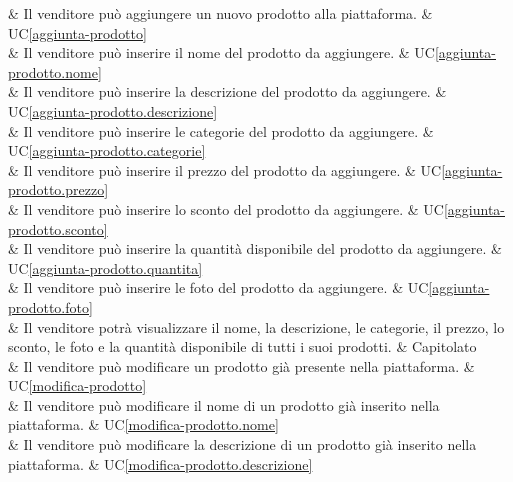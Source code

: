  & Il venditore può aggiungere un nuovo prodotto alla piattaforma. & UC\ref{aggiunta-prodotto} \\
	
 & Il venditore può inserire il nome del prodotto da aggiungere. & UC\ref{aggiunta-prodotto.nome} \\
	
 & Il venditore può inserire la descrizione del prodotto da aggiungere. & UC\ref{aggiunta-prodotto.descrizione} \\
	
 & Il venditore può inserire le categorie del prodotto da aggiungere. & UC\ref{aggiunta-prodotto.categorie} \\
	
 & Il venditore può inserire il prezzo del prodotto da aggiungere. & UC\ref{aggiunta-prodotto.prezzo} \\
	
 & Il venditore può inserire lo sconto del prodotto da aggiungere. & UC\ref{aggiunta-prodotto.sconto} \\
	
 & Il venditore può inserire la quantità disponibile del prodotto da aggiungere. & UC\ref{aggiunta-prodotto.quantita} \\
	
 & Il venditore può inserire le foto del prodotto da aggiungere. & UC\ref{aggiunta-prodotto.foto} \\
	
 & Il venditore potrà visualizzare il nome, la descrizione, le categorie, il prezzo, lo sconto, le foto e la quantità disponibile di tutti i suoi prodotti. & Capitolato \\
    
 & Il venditore può modificare un prodotto già presente nella piattaforma. & UC\ref{modifica-prodotto} \\
    
 & Il venditore può modificare il nome di un prodotto già inserito nella piattaforma. & UC\ref{modifica-prodotto.nome} \\
    
 & Il venditore può modificare la descrizione di un prodotto già inserito nella piattaforma. & UC\ref{modifica-prodotto.descrizione} \\
    
